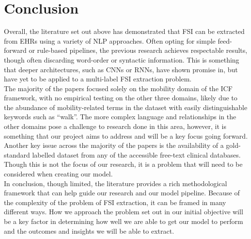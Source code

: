 \section{Conclusion}

Overall, the literature set out above has demonstrated that FSI can be extracted from EHRs using a variety of NLP approaches. Often opting for simple feed-forward or rule-based pipelines, the previous research achieves respectable results, though often discarding word-order or syntactic information. This is something that deeper architectures, such as CNNs or RNNs, have shown promise in, but have yet to be applied to a multi-label FSI extraction problem. \\

The majority of the papers focused solely on the mobility domain of the ICF framework, with no empirical testing on the other three domains, likely due to the abundance of mobility-related terms in the dataset with easily distinguishable keywords such as “walk”. The more complex language and relationships in the other domains pose a challenge to research done in this area, however, it is something that our project aims to address and will be a key focus going forward. \\

Another key issue across the majority of the papers is the availability of a gold-standard labelled dataset from any of the accessible free-text clinical databases. Though this is not the focus of our research, it is a problem that will need to be considered when creating our model. \\

In conclusion, though limited, the literature provides a rich methodological framework that can help guide our research and our model pipeline. Because of the complexity of the problem of FSI extraction, it can be framed in many different ways. How we approach the problem set out in our initial objective will be a key factor in determining how well we are able to get our model to perform and the outcomes and insights we will be able to extract.
